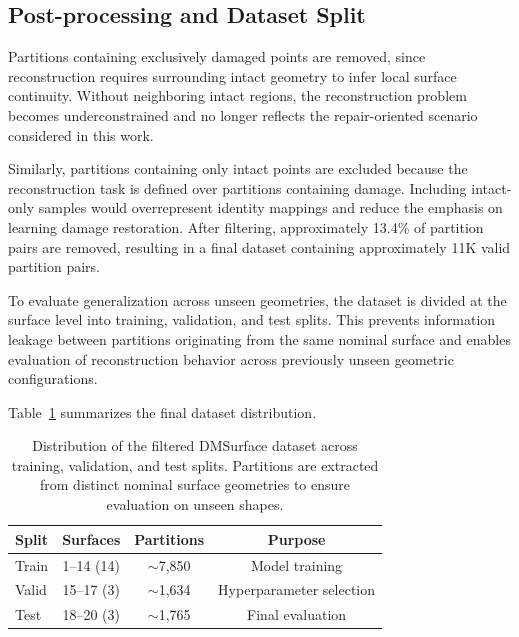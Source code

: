 \subsection{Post-processing and Dataset Split}

Partitions containing exclusively damaged points are removed, since reconstruction requires surrounding intact geometry to infer local surface continuity. Without neighboring intact regions, the reconstruction problem becomes underconstrained and no longer reflects the repair-oriented scenario considered in this work.


Similarly, partitions containing only intact points are excluded because the reconstruction task is defined over partitions containing damage. Including intact-only samples would overrepresent identity mappings and reduce the emphasis on learning damage restoration. After filtering, approximately 13.4\% of partition pairs are removed, resulting in a final dataset containing approximately 11K valid partition pairs.

To evaluate generalization across unseen geometries, the dataset is divided at the surface level into training, validation, and test splits. This prevents information leakage between partitions originating from the same nominal surface and enables evaluation of reconstruction behavior across previously unseen geometric configurations.

Table~\ref{tab:dmsurface_split} summarizes the final dataset distribution.

\begin{table}[h]
\small
\centering
\caption{Distribution of the filtered DMSurface dataset across training, validation, and test splits. Partitions are extracted from distinct nominal surface geometries to ensure evaluation on unseen shapes.}
\label{tab:dmsurface_split}
\begin{tabular}{l c c c}
\hline
\textbf{Split} &
\textbf{Surfaces} &
\textbf{Partitions} &
\textbf{Purpose} \\
\hline
Train & 1--14 (14) & $\sim$7,850 & Model training \\
Valid & 15--17 (3) & $\sim$1,634 & Hyperparameter selection \\
Test & 18--20 (3) & $\sim$1,765 & Final evaluation \\
\hline
\end{tabular}
\end{table}

